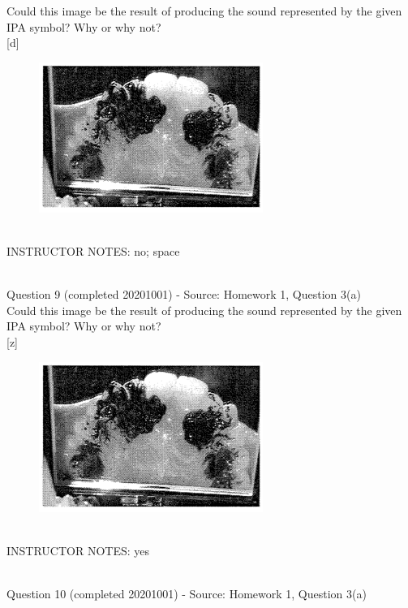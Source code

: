 \documentclass[12pt]{article}
\begin{document}
Could this image be the result of producing the sound represented by the given IPA symbol? Why or why not?\\

{[d]}

\begin{figure}[H]
\includegraphics{../images/staticpalatography_fricative.png}
\end{figure}

~\\
INSTRUCTOR NOTES: no; space


~\\

{\large Question 9} (completed 20201001) - Source: Homework 1, Question 3(a)\\

Could this image be the result of producing the sound represented by the given IPA symbol? Why or why not?\\

{[z]}

\begin{figure}[H]
\includegraphics{../images/staticpalatography_fricative.png}
\end{figure}

~\\
INSTRUCTOR NOTES: yes


~\\

{\large Question 10} (completed 20201001) - Source: Homework 1, Question 3(a)\\
\end{document}

